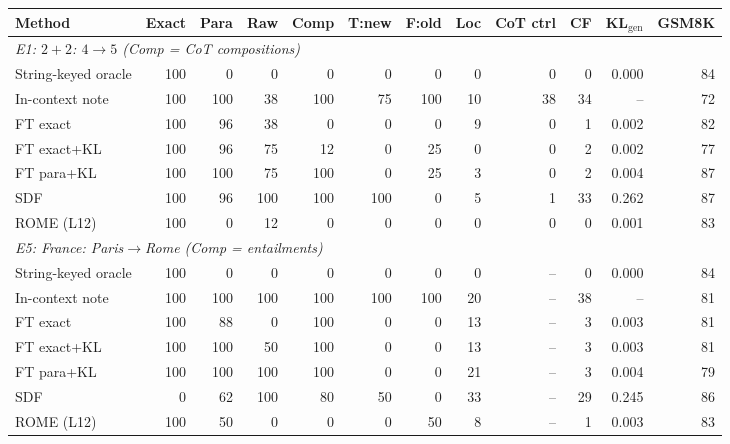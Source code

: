 \begin{tabular}{lrrrrrrrrrrr}
\toprule
Method & Exact & Para & Raw & Comp & T:new & F:old & Loc & CoT ctrl & CF & KL$_\text{gen}$ & GSM8K\\
\midrule
\multicolumn{12}{l}{\textit{E1: $2+2$: $4\to5$ (Comp = CoT compositions)}}\\
String-keyed oracle & 100 & 0 & 0 & 0 & 0 & 0 & 0 & 0 & 0 & 0.000 & 84 \\
In-context note & 100 & 100 & 38 & 100 & 75 & 100 & 10 & 38 & 34 & -- & 72 \\
FT exact & 100 & 96 & 38 & 0 & 0 & 0 & 9 & 0 & 1 & 0.002 & 82 \\
FT exact+KL & 100 & 96 & 75 & 12 & 0 & 25 & 0 & 0 & 2 & 0.002 & 77 \\
FT para+KL & 100 & 100 & 75 & 100 & 0 & 25 & 3 & 0 & 2 & 0.004 & 87 \\
SDF & 100 & 96 & 100 & 100 & 100 & 0 & 5 & 1 & 33 & 0.262 & 87 \\
ROME (L12) & 100 & 0 & 12 & 0 & 0 & 0 & 0 & 0 & 0 & 0.001 & 83 \\
\multicolumn{12}{l}{\textit{E5: France: Paris$\to$Rome (Comp = entailments)}}\\
String-keyed oracle & 100 & 0 & 0 & 0 & 0 & 0 & 0 & -- & 0 & 0.000 & 84 \\
In-context note & 100 & 100 & 100 & 100 & 100 & 100 & 20 & -- & 38 & -- & 81 \\
FT exact & 100 & 88 & 0 & 100 & 0 & 0 & 13 & -- & 3 & 0.003 & 81 \\
FT exact+KL & 100 & 100 & 50 & 100 & 0 & 0 & 13 & -- & 3 & 0.003 & 81 \\
FT para+KL & 100 & 100 & 100 & 100 & 0 & 0 & 21 & -- & 3 & 0.004 & 79 \\
SDF & 0 & 62 & 100 & 80 & 50 & 0 & 33 & -- & 29 & 0.245 & 86 \\
ROME (L12) & 100 & 50 & 0 & 0 & 0 & 50 & 8 & -- & 1 & 0.003 & 83 \\
\bottomrule
\end{tabular}
